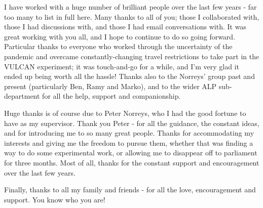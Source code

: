 
I have worked with a huge number of brilliant people over the last few years - far too many to list in full here. Many thanks to all of you; those I collaborated with, those I had discussions with, and those I had email conversations with. It was great working with you all, and I hope to continue to do so going forward. Particular thanks to everyone who worked through the uncertainty of the pandemic and overcame constantly-changing travel restrictions to take part in the VULCAN experiment; it was touch-and-go for a while, and I'm very glad it ended up being worth all the hassle! Thanks also to the Norreys' group past and present (particularly Ben, Ramy and Marko), and to the wider ALP sub-department for all the help, support and companionship.

Huge thanks is of course due to Peter Norreys, who I had the good fortune to have as my supervisor. Thank you Peter - for all the guidance, the constant ideas, and for introducing me to so many great people. Thanks for accommodating my interests and giving me the freedom to pursue them, whether that was finding a way to do some experimental work, or allowing me to disappear off to parliament for three months. Most of all, thanks for the constant support and encouragement over the last few years.

Finally, thanks to all my family and friends - for all the love, encouragement and support. You know who you are!


